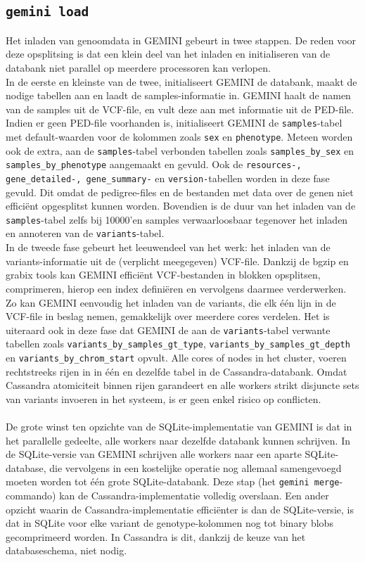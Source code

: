 \subsection{\texttt{gemini load}}
Het inladen van genoomdata in GEMINI gebeurt in twee stappen. De reden voor deze opsplitsing is dat een klein deel van het inladen en initialiseren van de databank niet parallel op meerdere processoren kan verlopen. \\In de eerste en kleinste van de twee, initialiseert GEMINI de databank, maakt de nodige tabellen aan en laadt de samples-informatie in. GEMINI haalt de namen van de samples uit de VCF-file, en vult deze aan met informatie uit de PED-file. Indien er geen PED-file voorhanden is, initialiseert GEMINI de \texttt{samples}-tabel met default-waarden voor de kolommen zoals \texttt{sex} en \texttt{phenotype}. Meteen worden ook de extra, aan de \texttt{samples}-tabel verbonden tabellen zoals \texttt{samples\_by\_sex} en \texttt{samples\_by\_phenotype} aangemaakt en gevuld. Ook de \texttt{resources-, gene\_detailed-, gene\_summary-} en \texttt{version-}tabellen worden in deze fase gevuld. Dit omdat de pedigree-files en de bestanden met data over de genen niet effici\"ent opgesplitst kunnen worden. Bovendien is de duur van het inladen van de \texttt{samples}-tabel zelfs bij 10000'en samples verwaarloosbaar tegenover het inladen en annoteren van de \texttt{variants}-tabel.\\
In de tweede fase gebeurt het leeuwendeel van het werk: het inladen van de variants-informatie uit de (verplicht meegegeven) VCF-file. Dankzij de bgzip \cite{bgzip} en grabix \cite{grabix} tools kan GEMINI effici\"ent VCF-bestanden in blokken opsplitsen, comprimeren, hierop een index defini\"eren en vervolgens daarmee verderwerken. Zo kan GEMINI eenvoudig het inladen van de variants, die elk \'e\'en lijn in de VCF-file in beslag nemen, gemakkelijk over meerdere cores verdelen. Het is uiteraard ook in deze fase dat GEMINI de aan de \texttt{variants}-tabel verwante tabellen zoals \texttt{variants\_by\_samples\_gt\_type}, \texttt{variants\_by\_samples\_gt\_depth} en \texttt{variants\_by\_chrom\_start} opvult. Alle cores of nodes in het cluster, voeren rechtstreeks rijen in in \'e\'en en dezelfde tabel in de Cassandra-databank. Omdat Cassandra atomiciteit binnen rijen garandeert en alle workers strikt disjuncte sets van variants invoeren in het systeem, is er geen enkel risico op conflicten.\\\\
De grote winst ten opzichte van de SQLite-implementatie van GEMINI is dat in het parallelle gedeelte, alle workers naar dezelfde databank kunnen schrijven. In de SQLite-versie van GEMINI schrijven alle workers naar een aparte SQLite-database, die vervolgens in een kostelijke operatie nog allemaal samengevoegd moeten worden tot \'e\'en grote SQLite-databank. Deze stap (het \texttt{gemini merge}-commando) kan de Cassandra-implementatie volledig overslaan. Een ander opzicht waarin de Cassandra-implementatie effici\"enter is dan de SQLite-versie, is dat in SQLite voor elke variant de genotype-kolommen nog tot binary blobs gecomprimeerd worden. In Cassandra is dit, dankzij de keuze van het databaseschema, niet nodig.

